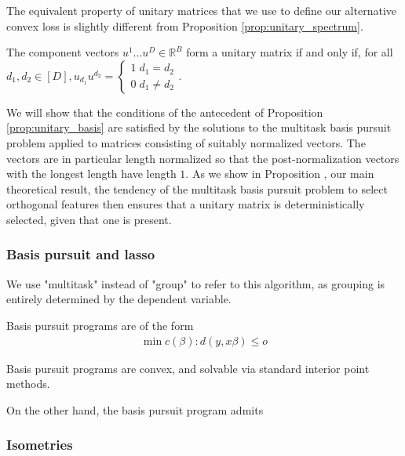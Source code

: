 The equivalent property of unitary matrices that we use to define our alternative convex loss is slightly different from Proposition \ref{prop:unitary_spectrum}.
\begin{proposition}
\label{prop:unitary_basis}
The component vectors $u^1 \dots u^D \in \mathbb R^B$ form a unitary matrix if and only if, for all $d_1, d_2 \in [D], u_{d_1} u^{d_2} = \begin{cases}
1 \; d_1 = d_2\\ 
0 \; d_1 \neq d_2 
\end{cases}$.
\end{proposition}

We will show that the conditions of the antecedent of Proposition \ref{prop:unitary_basis} are satisfied by the solutions to the multitask basis pursuit problem applied to matrices consisting of suitably normalized vectors.
The vectors are in particular length normalized so that the post-normalization vectors with the longest length have length $1$.
As we show in Proposition , our main theoretical result,  the tendency of the multitask basis pursuit problem to select orthogonal features then ensures that a unitary matrix is deterministically selected, given that one is present.


\subsubsection{Basis pursuit and lasso}


We use "multitask" instead of "group" to refer to this algorithm, as grouping is entirely determined by the dependent variable.

Basis pursuit programs are of the form 
\begin{align}
\min c(\beta) : d(y, x\beta) \leq o
\end{align}

Basis pursuit programs are convex, and solvable via standard interior point methods.

On the other hand, the basis pursuit program admits 

\subsubsection{Isometries}

